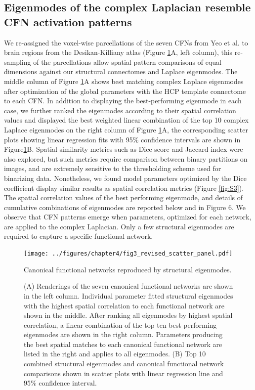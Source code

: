 \subsection{Eigenmodes of the complex Laplacian resemble CFN activation patterns}
We re-assigned the voxel-wise parcellations of the seven CFNs from Yeo et al. \cite{Yeo2011} to brain regions from the Desikan-Killiany atlas (Figure \ref{fig:fig3}A, left column), this re-sampling of the parcellations allow spatial pattern comparisons of equal dimensions against our structural connectomes and Laplace eigenmodes. The middle column of Figure \ref{fig:fig3}A shows best matching complex Laplace eigenmodes after optimization of the global parameters with the HCP template connectome to each CFN. In addition to displaying the best-performing eigenmode in each case, we further ranked the eigenmodes according to their spatial correlation values and displayed the best weighted linear combination of the top 10 complex Laplace eigenmodes on the right column of Figure \ref{fig:fig3}A, the corresponding scatter plots showing linear regression fits with 95\% confidence intervals are shown in Figure\ref{fig:fig3}B.  Spatial similarity metrics such as Dice score and Jaccard index were also explored, but such metrics require comparison between binary partitions on images, and are extremely sensitive to the thresholding scheme used for binarizing data. Nonetheless, we found model parameters optimized by the Dice coefficient display similar results as spatial correlation metrics (Figure \ref{fig:S3}). The spatial correlation values of the best performing eigenmode, and details of cumulative combinations of eigenmodes are reported below and in Figure 6. We observe that CFN patterns emerge when parameters, optimized for each network, are applied to the complex Laplacian. Only a few structural eigenmodes are required to capture a specific functional network. 

\begin{figure}[htp]
 \centering
 \texttt{[image: ../figures/chapter4/fig3\_revised\_scatter\_panel.pdf]}
 \caption{Canonical functional networks reproduced by structural eigenmodes.}
 \caption*{(A) Renderings of the seven canonical functional networks are shown in the left column. Individual parameter fitted structural eigenmodes with the highest spatial correlation to each functional network are shown in the middle. After ranking all eigenmodes by highest spatial correlation, a linear combination of the top ten best performing eigenmodes are shown in the right column. Parameters producing the best spatial matches to each canonical functional network are listed in the right and applies to all eigenmodes. (B) Top 10 combined structural eigenmodes and canonical functional network comparisons shown in scatter plots with linear regression line and 95\% confidence interval.}
 \label{fig:fig3}
\end{figure}

